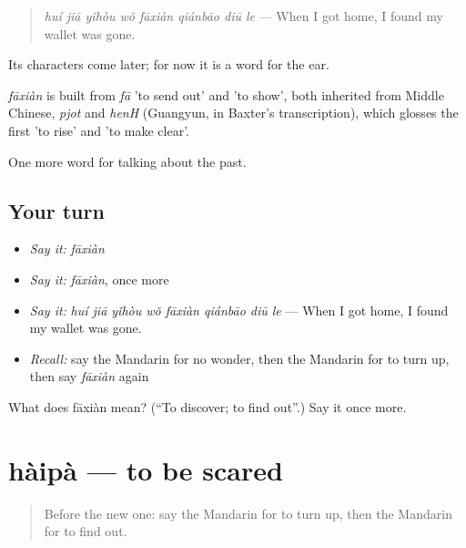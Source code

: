 \begin{quote}
\emph{huí jiā yǐhòu wǒ fāxiàn qiánbāo diū le} — When I got home, I found my wallet was gone.
\end{quote}

Its characters come later; for now it is a word for the ear.

\begin{cousinweb}
\emph{fāxiàn} is built from \emph{fā} 'to send out' and  'to show', both inherited from Middle Chinese, \emph{pjot} and \emph{henH} (Guangyun, in Baxter's transcription), which glosses the first 'to rise' and 'to make clear'.
\end{cousinweb}

\begin{grammarlens}[title={What you've built}]
One more word for talking about the past.
\end{grammarlens}

\subsection*{Your turn}
\begin{itemize}
\raggedright
  \item \emph{Say it:} \emph{fāxiàn}
  \item \emph{Say it:} \emph{fāxiàn}, once more
  \item \emph{Say it:} \emph{huí jiā yǐhòu wǒ fāxiàn qiánbāo diū le} — When I got home, I found my wallet was gone.
  \item \emph{Recall:} say the Mandarin for no wonder, then the Mandarin for to turn up, then say \emph{fāxiàn} again
\end{itemize}

\begin{tcolorbox}[breakable,colback=teal!4,colframe=teal!35!black,title={Before you move on}]
What does fāxiàn mean? (\textquotedblleft{}To discover; to find out\textquotedblright{}.) Say it once more.
\end{tcolorbox}
\section[hàipà]{hàipà — to be scared}

\label{lesson:ZH-C236-haipa}



\begin{quote}
Before the new one: say the Mandarin for to turn up, then the Mandarin for to find out.
\end{quote}

